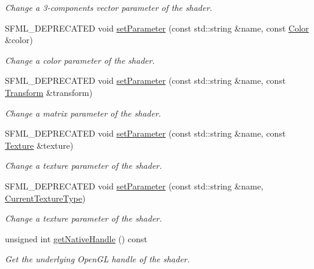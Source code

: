 \begin{DoxyCompactItemize}
\begin{DoxyCompactList}\small\item\em Change a 3-\/components vector parameter of the shader. \end{DoxyCompactList}\item 
S\+F\+M\+L\+\_\+\+D\+E\+P\+R\+E\+C\+A\+T\+ED void \mbox{\hyperlink{classsf_1_1_shader_a66e68e64c06ef5501e50dd5903cab51c}{set\+Parameter}} (const std\+::string \&name, const \mbox{\hyperlink{classsf_1_1_color}{Color}} \&color)
\begin{DoxyCompactList}\small\item\em Change a color parameter of the shader. \end{DoxyCompactList}\item 
S\+F\+M\+L\+\_\+\+D\+E\+P\+R\+E\+C\+A\+T\+ED void \mbox{\hyperlink{classsf_1_1_shader_a398a802fc5295ab69b0317892b0f0c75}{set\+Parameter}} (const std\+::string \&name, const \mbox{\hyperlink{classsf_1_1_transform}{Transform}} \&transform)
\begin{DoxyCompactList}\small\item\em Change a matrix parameter of the shader. \end{DoxyCompactList}\item 
S\+F\+M\+L\+\_\+\+D\+E\+P\+R\+E\+C\+A\+T\+ED void \mbox{\hyperlink{classsf_1_1_shader_a08c7cafd4f73ab898319c4fd7d8b5501}{set\+Parameter}} (const std\+::string \&name, const \mbox{\hyperlink{classsf_1_1_texture}{Texture}} \&texture)
\begin{DoxyCompactList}\small\item\em Change a texture parameter of the shader. \end{DoxyCompactList}\item 
S\+F\+M\+L\+\_\+\+D\+E\+P\+R\+E\+C\+A\+T\+ED void \mbox{\hyperlink{classsf_1_1_shader_a0fa7ecad14206e4d5edae1d6aa87f553}{set\+Parameter}} (const std\+::string \&name, \mbox{\hyperlink{structsf_1_1_shader_1_1_current_texture_type}{Current\+Texture\+Type}})
\begin{DoxyCompactList}\small\item\em Change a texture parameter of the shader. \end{DoxyCompactList}\item 
unsigned int \mbox{\hyperlink{classsf_1_1_shader_ac14d0bf7afe7b6bb415d309f9c707188}{get\+Native\+Handle}} () const
\begin{DoxyCompactList}\small\item\em Get the underlying Open\+GL handle of the shader. \end{DoxyCompactList}\end{DoxyCompactItemize}
